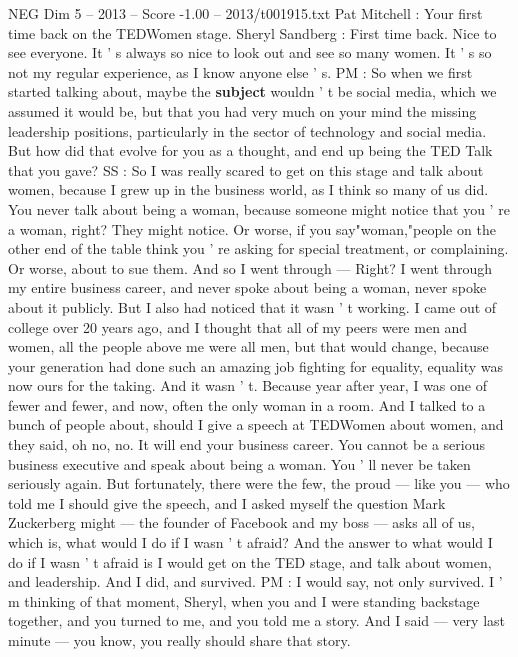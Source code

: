\begin{textsample}{NEG Dim 5 – 2013 – Score -1.00 – 2013/t001915.txt}  \label{ex:f5_neg_042}
Pat Mitchell : Your first time back on the TEDWomen stage.
Sheryl Sandberg : First time back.
Nice to see everyone.
It ' s always so nice to look out and see so many women.
It ' s so not my regular experience, as I know anyone else ' s.
PM : So when we first started talking about, maybe the \textbf{subject} wouldn ' t be social media, which we assumed it would be, but that you had very much on your mind the missing leadership positions, particularly in the sector of technology and social media.
But how did that evolve for you as a thought, and end up being the TED Talk that you gave?
SS : So I was really scared to get on this stage and talk about women, because I grew up in the business world, as I think so many of us did.
You never talk about being a woman, because someone might notice that you ' re a woman, right?
They might notice.
Or worse, if you say"woman,"people on the other end of the table think you ' re asking for special treatment, or complaining.
Or worse, about to sue them.
And so I went through — Right?
I went through my entire business career, and never spoke about being a woman, never spoke about it publicly.
But I also had noticed that it wasn ' t working.
I came out of college over 20 years ago, and I thought that all of my peers were men and women, all the people above me were all men, but that would change, because your generation had done such an amazing job fighting for equality, equality was now ours for the taking.
And it wasn ' t.
Because year after year, I was one of fewer and fewer, and now, often the only woman in a room.
And I talked to a bunch of people about, should I give a speech at TEDWomen about women, and they said, oh no, no.
It will end your business career.
You cannot be a serious business executive and speak about being a woman.
You ' ll never be taken seriously again.
But fortunately, there were the few, the proud — like you — who told me I should give the speech, and I asked myself the question Mark Zuckerberg might — the founder of Facebook and my boss — asks all of us, which is, what would I do if I wasn ' t afraid?
And the answer to what would I do if I wasn ' t afraid is I would get on the TED stage, and talk about women, and leadership.
And I did, and survived.
PM : I would say, not only survived.
I ' m thinking of that moment, Sheryl, when you and I were standing backstage together, and you turned to me, and you told me a story.
And I said — very last minute — you know, you really should share that story.

\end{textsample}

